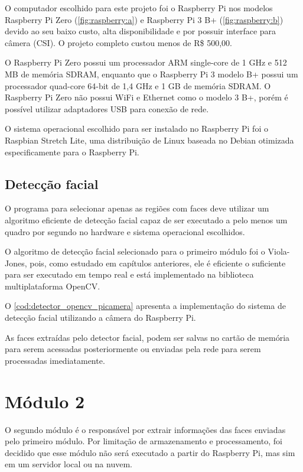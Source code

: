 O computador escolhido para este projeto foi o Raspberry Pi nos modelos Raspberry Pi Zero (\autoref{fig:raspberry:a}) e Raspberry Pi 3 B+ (\autoref{fig:raspberry:b}) devido ao seu baixo custo, alta disponibilidade e por possuir interface para câmera (CSI). O projeto completo custou menos de R\$ 500,00.

O Raspberry Pi Zero possui um processador ARM single-core de 1 GHz e 512 MB de memória SDRAM, enquanto que o Raspberry Pi 3 modelo B+ possui um processador quad-core 64-bit de 1,4 GHz e 1 GB de memória SDRAM. O Raspberry Pi Zero não possui WiFi e Ethernet como o modelo 3 B+, porém é possível utilizar adaptadores USB para conexão de rede.

O sistema operacional escolhido para ser instalado no Raspberry Pi foi o Raspbian Stretch Lite, uma distribuição de Linux baseada no Debian otimizada especificamente para o Raspberry Pi.

\subsection{Detecção facial}

O programa para selecionar apenas as regiões com faces deve utilizar um algoritmo eficiente de detecção facial capaz de ser executado a pelo menos um quadro por segundo no hardware e sistema operacional escolhidos.

O algoritmo de detecção facial selecionado para o primeiro módulo foi o Viola-Jones, pois, como estudado em capítulos anteriores, ele é eficiente o suficiente para ser executado em tempo real e está implementado na biblioteca multiplataforma OpenCV.

O \autoref{cod:detector_opencv_picamera} apresenta a implementação do sistema de detecção facial utilizando a câmera do Raspberry Pi.

As faces extraídas pelo detector facial, podem ser salvas no cartão de memória para serem acessadas posteriormente ou enviadas pela rede para serem processadas imediatamente.

\section{Módulo 2}\label{sec:modulo2}

O segundo módulo é o responsável por extrair informações das faces enviadas pelo primeiro módulo. Por limitação de armazenamento e processamento, foi decidido que esse módulo não será executado a partir do Raspberry Pi, mas sim em um servidor local ou na nuvem.

